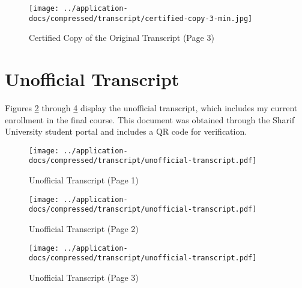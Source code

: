 \clearpage

\vspace*{\fill}
\begin{figure}[H]
    \centering
    \texttt{[image: ../application-docs/compressed/transcript/certified-copy-3-min.jpg]}
    \caption{Certified Copy of the Original Transcript (Page 3)}
    \label{fig:certified-copy-transcript-3}
\end{figure}
\vspace*{\fill}

\clearpage

\section{Unofficial Transcript}\label{sec:unofficial-transcript}

Figures \ref{fig:unofficial-transcript-1} through \ref{fig:unofficial-transcript-3} display the unofficial transcript, which includes my current enrollment in the final course. This document was obtained through the Sharif University student portal and includes a QR code for verification.

\vspace*{\fill}
\begin{figure}[H]
    \centering
    \texttt{[image: ../application-docs/compressed/transcript/unofficial-transcript.pdf]}
    \caption{Unofficial Transcript (Page 1)}
    \label{fig:unofficial-transcript-1}
\end{figure}
\vspace*{\fill}

\clearpage

\vspace*{\fill}
\begin{figure}[H]
    \centering
    \texttt{[image: ../application-docs/compressed/transcript/unofficial-transcript.pdf]}
    \caption{Unofficial Transcript (Page 2)}
    \label{fig:unofficial-transcript-2}
\end{figure}
\vspace*{\fill}

\clearpage

\vspace*{\fill}
\begin{figure}[H]
    \centering
    \texttt{[image: ../application-docs/compressed/transcript/unofficial-transcript.pdf]}
    \caption{Unofficial Transcript (Page 3)}
    \label{fig:unofficial-transcript-3}
\end{figure}
\vspace*{\fill}

\clearpage

